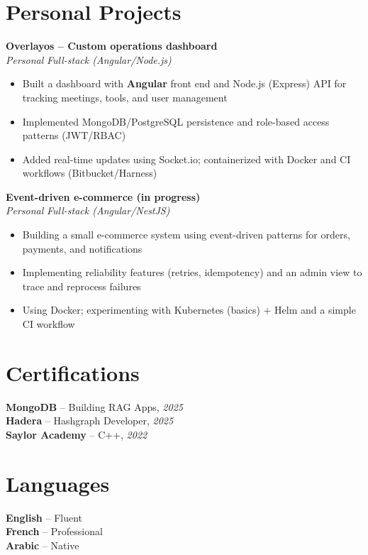 \documentclass[10pt,a4paper]{article}
\begin{document}
\vspace{4pt}
\section*{Personal Projects}
{\small
\textbf{Overlayos -- Custom operations dashboard}\\[1pt]
\textit{Personal} \hfill \textit{Full-stack (Angular/Node.js)}
\begin{itemize}
  \item Built a dashboard with \textbf{Angular} front end and Node.js (Express) API for tracking meetings, tools, and user management
  \item Implemented MongoDB/PostgreSQL persistence and role-based access patterns (JWT/RBAC)
  \item Added real-time updates using Socket.io; containerized with Docker and CI workflows (Bitbucket/Harness)
\end{itemize}

\vspace{2pt}
\textbf{Event-driven e-commerce (in progress)}\\[1pt]
\textit{Personal} \hfill \textit{Full-stack (Angular/NestJS)}
\begin{itemize}
  \item Building a small e-commerce system using event-driven patterns for orders, payments, and notifications
  \item Implementing reliability features (retries, idempotency) and an admin view to trace and reprocess failures
  \item Using Docker; experimenting with Kubernetes (basics) + Helm and a simple CI workflow
\end{itemize}
}

\vspace{3pt}
\section*{Certifications}
{\small
\textbf{MongoDB} -- Building RAG Apps, \textit{2025}\\[1pt]
\textbf{Hadera} -- Hashgraph Developer, \textit{2025}\\[1pt]
\textbf{Saylor Academy} -- C++, \textit{2022}
}

\section*{Languages}
{\small
\textbf{English} -- Fluent\\[1pt]
\textbf{French} -- Professional\\[1pt]
\textbf{Arabic} -- Native
}
\end{document}

